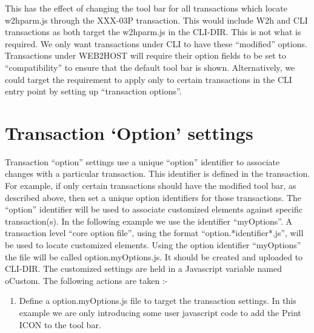 \documentclass[letterpaper,10pt,english]{sphinxmanual}
\begin{document}
This has the effect of changing the tool bar for all transactions which locate w2hparm.js through the XXX-03P transaction. This would include W2h and CLI transactions as both target the w2hparm.js in the CLI-DIR. This is not what is required. We only want transactions under CLI to have these “modified” options. Transactions under WEB2HOST will require their option fields to be set to “compatibility” to ensure that the default tool bar is shown. Alternatively, we could target the requirement to apply only to certain transactions in the CLI entry point by  setting up “transaction options”.



\section{Transaction ‘Option’ settings}
\label{\detokenize{TN202002:transaction-option-settings}}
Transaction “option” settings use a unique “option” identifier to associate changes with a particular transaction. This identifier is defined in the transaction. For example, if only certain transactions should have the modified tool bar, as described above, then set a unique option identifiers for those transactions. The “option” identifier will be used to associate customized elements against specific transaction(s). In the following example we use the identifier “myOptions”. A transaction level “core option file”, using the format “option.*identifier*.js”, will be used to locate customized elements. Using the option identifier “myOptions” the file will be called option.myOptions.js. It should be created and uploaded to CLI-DIR. The customized settings are held in a Javascript variable named oCustom. The following actions are taken :-
\begin{enumerate}
\def\theenumi{\arabic{enumi}}
\def\labelenumi{\theenumi .}
\makeatletter\def\p@enumii{\p@enumi \theenumi .}\makeatother
\item {} 
Define a option.myOptions.js file to target the transaction settings. In this example we are only introducing some user javascript code to add the Print ICON to the tool bar.

\end{enumerate}
\end{document}
